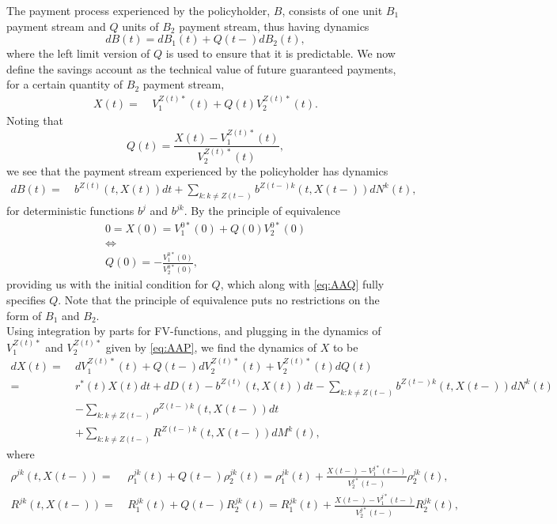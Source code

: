 \documentclass[12pt]{article}
\newcommand{\E}{\text{E}}
\theoremstyle{my_thm}
\theoremstyle{my_rem}
\begin{document}
The payment process experienced by the policyholder, $B$, consists of one unit $B_1$ payment stream and $Q$ units of $B_2$ payment stream, thus having dynamics
$$
dB(t)=dB_1(t)+ Q(t-)dB_2(t),
$$
where the left limit version of $Q$ is used to ensure that it is predictable. We now define the savings account as the technical value of future guaranteed payments, for a certain quantity of $B_2$ payment stream,
\begin{align*}
X(t)= \ &
V_1^{Z(t)*}(t)+Q(t)V_2^{Z(t)*}(t). 
\end{align*}
Noting that
$$
Q(t)=\frac{X(t)-V_1^{Z(t)*}(t)}{V_2^{Z(t)*}(t)},
$$
we see that the payment stream experienced by the policyholder has dynamics
\begin{align*}
dB(t)%
= \ &b^{Z(t)}(t,X(t)) dt +\sum_{k:k \neq Z(t-)} b^{Z(t-)k}(t,X(t-))dN^k(t),
\end{align*}
for deterministic functions $b^j$ and $b^{jk}$. By the principle of equivalence
\begin{gather*}
0=X(0)=V_1^{0*}(0)+Q(0)V_2^{0*}(0)
\\
\Leftrightarrow
\\
Q(0)=-\frac{V_1^{0*}(0)}{V_2^{0*}(0)},
\end{gather*}
providing us with the initial condition for $Q$, which along with \eqref{eq:AAQ} fully specifies $Q$. Note that the principle of equivalence puts no restrictions on the form of $B_1$ and $B_2$.
\\[12pt]
Using integration by parts for FV-functions, and plugging in the dynamics of $V_1^{Z(t)*}$ and $V_2^{Z(t)*}$ given by \eqref{eq:AAP}, we find the dynamics of $X$ to be
\begin{align}
dX(t)= \ &
dV_1^{Z(t)*}(t)+Q(t-)dV_2^{Z(t)*}(t)+V_2^{Z(t)*}(t)dQ(t) \nonumber
\\
= \ &
r^*(t)X(t)dt
 +dD(t)
 -b^{Z(t)}(t,X(t)) dt
- \sum_{k:k \neq Z(t-)} b^{Z(t-)k}(t,X(t-)) dN^k(t)
\nonumber \\
&- \sum_{k:k \neq Z(t-)} \rho^{Z(t-)k}(t,X(t-))dt
\nonumber \\
&+ \sum_{k:k \neq Z(t-)}  R^{Z(t-)k}(t,X(t-))dM^k(t),\label{eq:AAB}
\end{align}
where
\begin{align*}
\rho^{jk}(t,X(t-))= \ &\rho_1^{jk}(t)+Q(t-)\rho_2^{jk}(t)=\rho_1^{jk}(t)+\frac{X(t-)-V_1^{j*}(t-)}{V_2^{j*}(t-)}\rho_2^{jk}(t),
\\
R^{jk}(t,X(t-))= \ &R_1^{jk}(t)+Q(t-)R_2^{jk}(t)=R_1^{jk}(t)+\frac{X(t-)-V_1^{j*}(t-)}{V_2^{j*}(t-)}R_2^{jk}(t),
\end{align*}
\end{document}
